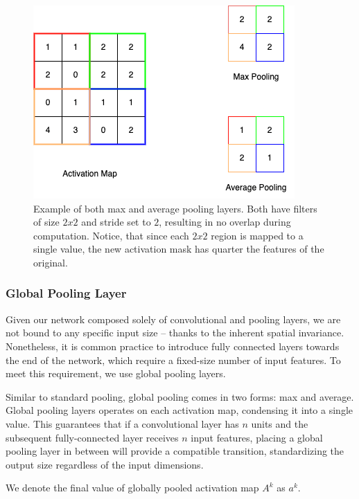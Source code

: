 \begin{figure}[!h]
    \begin{center}
    \begin{minipage}{0.5\textwidth}
      \includegraphics[width=\textwidth]{img/cnn-pool.png}
    \end{minipage}
    \caption{Example of both max and average pooling layers. Both have filters of size $2x2$ and stride set to $2$, resulting in no overlap during computation. Notice, that since each $2x2$ region is mapped to a single value, the new activation mask has quarter the features of the original.}
    \label{fig:cnn-pooling}
    \end{center}
\end{figure}

\subsubsection{Global Pooling Layer}

Given our network composed solely of convolutional and pooling layers, we are not bound to any specific input size -- thanks to the inherent spatial invariance. Nonetheless, it is common practice to introduce fully connected layers towards the end of the network, which require a fixed-size number of input features. To meet this requirement, we use global pooling layers.

Similar to standard pooling, global pooling comes in two forms: max and average. Global pooling layers operates on each activation map, condensing it into a single value. This guarantees that if a convolutional layer has $n$ units and the subsequent fully-connected layer receives $n$ input features, placing a global pooling layer in between will provide a compatible transition, standardizing the output size regardless of the input dimensions.

We denote the final value of globally pooled activation map $A^k$ as $a^k$.
